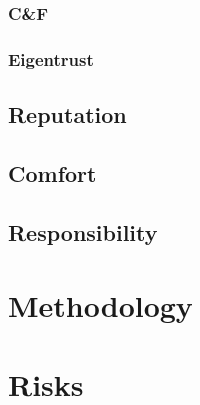 \subsubsection*{C\&F}\label{sec:cnf}

\subsubsection*{Eigentrust}\label{sec:eigentrust}

\subsection*{Reputation}

\subsection*{Comfort}

\subsection*{Responsibility}


\section{Methodology}
\label{sec:methodology}








\section{Risks}
\label{sec:risks}


